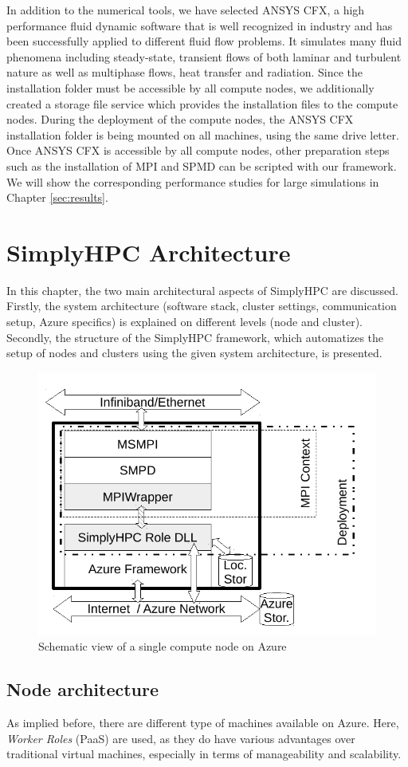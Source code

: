 \documentclass[3p,times]{elsarticle}
\begin{document}
In addition to the numerical tools, we have selected ANSYS CFX, a high performance fluid dynamic software that is well recognized in industry and has been successfully applied to different fluid flow problems. It simulates many fluid phenomena including steady-state, transient flows of both laminar and turbulent nature as well as multiphase flows, heat transfer and radiation. Since the installation folder must be accessible by all compute nodes, we additionally created a storage file service which provides the installation files to the compute nodes. During the deployment of the compute nodes, the ANSYS CFX installation folder is being mounted on all machines, using the same drive letter. Once ANSYS CFX is accessible by all compute nodes, other preparation steps such as the installation of MPI and SPMD can be scripted with our framework. We will show the corresponding performance studies for large simulations in Chapter \ref{sec:results}.

\section{SimplyHPC Architecture}
\label{sec:architecture}
In this chapter, the two main architectural aspects of SimplyHPC are discussed. Firstly, the system architecture (software stack, cluster settings, communication setup, Azure specifics) is explained on different levels (node and cluster). Secondly, the structure of the SimplyHPC framework, which automatizes the setup of nodes and clusters using the given system architecture, is presented.



\begin{figure}
	\centering
	\includegraphics[width=.5\linewidth]{azureWorkerRole.pdf}
	\caption{Schematic view of a single compute node on Azure}

	\label{fig:schemaRole}
\end{figure}

\subsection{Node architecture}
As implied before, there are different type of machines available on Azure. Here, \textit{Worker Roles} (PaaS) are used, as they do have various advantages over traditional virtual machines, especially in terms of manageability and scalability. 
\end{document}
